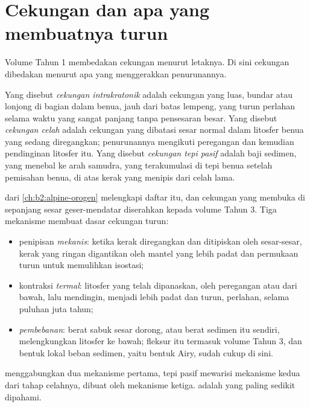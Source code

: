 \section{Cekungan dan apa yang membuatnya turun}\label{sec:b2:basins-compared:types}

Volume Tahun 1 membedakan cekungan menurut letaknya. Di sini cekungan dibedakan menurut apa yang menggerakkan
penurunannya.

\begin{definition}\label{def:b2:basins-compared:types}
Yang disebut \emph{cekungan intrakratonik} adalah cekungan yang luas, bundar atau lonjong di
bagian dalam benua, jauh dari batas lempeng, yang turun perlahan selama waktu yang sangat panjang
tanpa pensesaran besar. Yang disebut \emph{cekungan celah} adalah cekungan yang dibatasi sesar normal
dalam litosfer benua yang sedang diregangkan; penurunannya mengikuti peregangan dan kemudian
pendinginan litosfer itu. Yang disebut \emph{cekungan tepi pasif} adalah
baji sedimen, yang menebal ke arah samudra, yang terakumulasi di tepi benua setelah
pemisahan benua, di atas kerak yang menipis dari celah lama.
\end{definition}

 dari \cref{ch:b2:alpine-orogen} melengkapi daftar itu, dan cekungan yang membuka
di sepanjang sesar geser-mendatar diserahkan kepada volume Tahun 3. Tiga mekanisme membuat dasar
cekungan turun:
\begin{itemize}
  \item penipisan \emph{mekanis}: ketika kerak diregangkan dan ditipiskan oleh sesar-sesar, kerak yang ringan
        digantikan oleh mantel yang lebih padat dan permukaan turun untuk memulihkan isostasi;
  \item kontraksi \emph{termal}: litosfer yang telah dipanaskan, oleh peregangan atau dari
        bawah, lalu mendingin, menjadi lebih padat dan turun, perlahan, selama puluhan juta tahun;
  \item \emph{pembebanan}: berat sabuk sesar dorong, atau berat sedimen itu sendiri, melengkungkan
        litosfer ke bawah; fleksur itu termasuk volume Tahun 3, dan bentuk lokal beban sedimen, yaitu bentuk
        Airy, sudah cukup di sini.
\end{itemize}
 menggabungkan dua mekanisme pertama, tepi pasif mewarisi mekanisme kedua dari tahap celahnya,
 dibuat oleh mekanisme ketiga.  adalah yang paling sedikit dipahami.

